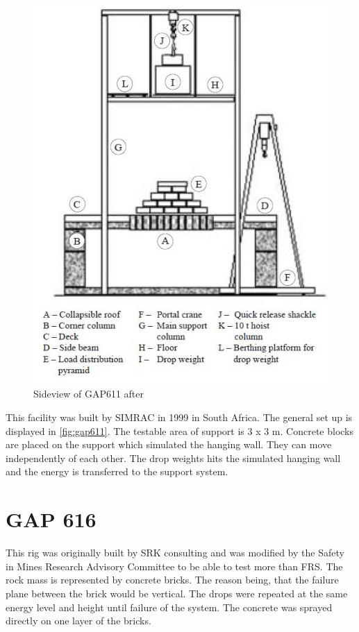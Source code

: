 \begin{figure}
    \centering
    \includegraphics{pics/GAP611_side.JPG}
    \caption{Sideview of GAP611 after \autocite{human04}}
    \label{fig:gap611}
\end{figure}

This facility was built by SIMRAC in 1999 in South Africa. The general set up is displayed in \autoref{fig:gap611}.
The testable area of support is 3 x 3 m. Concrete blocks are placed on the support which simulated the hanging wall. They can move independently of each other. The drop weights hits the simulated hanging wall and the energy is transferred to the support system. \autocite{human04}


\section{GAP 616}

This rig was originally built by SRK consulting and was modified by the Safety in Mines Research Advisory Committee to be able to test more than FRS. The rock mass is represented by concrete bricks. The reason being, that the failure plane between the brick would be vertical. The drops were repeated at the same energy level and height until failure of the system. The concrete was sprayed directly on one layer of the bricks. 



